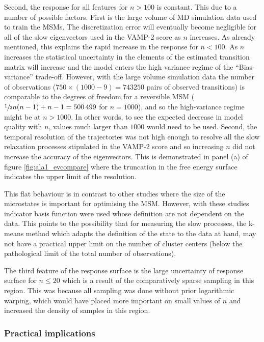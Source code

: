 Second, the response for all features for $n > 100$ is constant. This due to a number of possible factors. First is the large volume of MD simulation data used to train the MSMs. The discretization error will eventually become negligible for all of the  slow eigenvectors used in the VAMP-2 score as $n$ increases. As already mentioned, this explains the rapid increase in the response for $n<100$. As $n$ increases the statistical uncertainty in the elements of the estimated transition matrix will increase and the model enters the high variance regime of the ``Bias-variance'' trade-off.  However, with the large volume simulation data the number of observations ($750\times(1000-9) = \num{743250}$ pairs of observed transitions) is comparable to the degrees of freedom for a reversible MSM ($\sfrac{1}{2}n(n-1)+n-1=\num{500499}$ for $n=1000$), and so the high-variance regime might be at $n>1000$. In other words, to see the expected decrease in model quality with $n$, values much larger than $1000$ would need to be used. Second, the temporal resolution of the trajectories was not high enough to resolve all the slow relaxation processes stipulated in the VAMP-2 score and so increasing $n$ did not increase the accuracy of the eigenvectors.  This is demonstrated in panel (a) of figure \ref{fig:ala1_evcompare} where the truncation in the free energy surface indicates the upper limit of the resolution. 

This flat behaviour is in contrast to other studies \cite{mcgibbonVariationalCrossvalidationSlow2015,wuVariationalApproachLearning2020c,prinzMarkovModelsMolecular2011} where the size of the microstates is important for optimising the MSM. However, with these studies indicator basis function were used whose definition are not dependent on the data. This points to the possibility that for measuring the slow processes, the k-means method which adapts the definition of the state to the data at hand, may not have a practical upper limit on the number of cluster centers (below the pathological limit of the total number of observations). 

The third feature of the response surface is the large uncertainty of response surface for $n \leq 20$ which is a result of the comparatively sparse sampling in this region. This was because all sampling was done without prior logarithmic warping, which would have placed more important on small values of $n$ and increased the density of samples in this region.  
 
\subsubsection{Practical implications}

